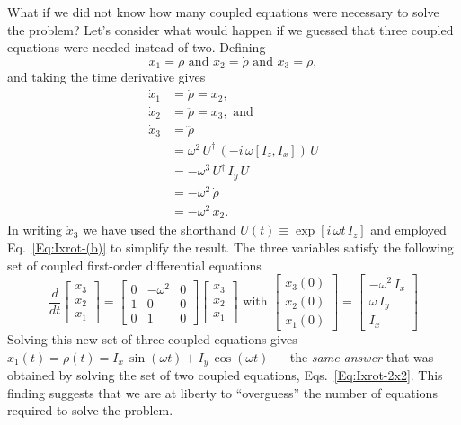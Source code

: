 What if we did not know how many coupled equations were necessary to solve the problem?  Let's consider what would happen if we guessed that three coupled equations were needed instead of two.
Defining
\begin{equation}
x_1 = \rho \text{ and } x_2 = \dot{\rho} \text{ and } x_3 = \ddot{\rho},
\end{equation}
and taking the time derivative gives
\begin{subequations}
\begin{align}
\dot{x}_1 & = \dot{\rho} = x_2, \\
\dot{x}_2 & = \ddot{\rho} = x_3, \text{ and} \\
\dot{x}_3 & = \dddot{\rho} \\
	& = \omega^2 \, U^{\dagger} \, (-i \, \omega [I_z,I_x] ) \, U \\
	& = - \omega^3 \, U^{\dagger} \, I_{y} \, U \\
	& = - \omega^2 \, \dot{\rho} \\
	& = - \omega^2 \, x_2.
\end{align}
\end{subequations}
In writing $\dot{x}_3$ we have used the shorthand $U(t) \equiv \exp{[i \, \omega t \, I_z]}$ and employed Eq.~\ref{Eq:Ixrot-(b)} to simplify the result.  The three variables satisfy the following set of coupled first-order differential equations
\begin{equation}
\frac{d}{dt} \begin{bmatrix} x_3 \\ x_2 \\ x_1 \end{bmatrix}
	= \begin{bmatrix} 
	    0 & -\omega^2 & 0 \\
		1 & 0 & 0 \\
		0 & 1 & 0
	  \end{bmatrix}
	  \begin{bmatrix} 
	  	x_3 \\ x_2 \\ x_1
	   \end{bmatrix}
\text{ with } 
\begin{bmatrix}
    x_3(0) \\
    x_2(0) \\ 
    x_1(0) 
 \end{bmatrix}
=
\begin{bmatrix}
	- \omega^2 \, I_{x} \\ 
	\omega \, I_{y} \\
	I_{x}
\end{bmatrix}
\end{equation}
Solving this new set of three coupled equations gives $x_1(t) = \rho(t) = I_x \, \sin{(\omega t)} + I_y \, \cos{(\omega t)}$ --- the \emph{same answer} that was obtained by solving the set of two coupled equations, Eqs.~\ref{Eq:Ixrot-2x2}.  This finding suggests that we are at liberty to ``overguess'' the number of equations required to solve the problem.

